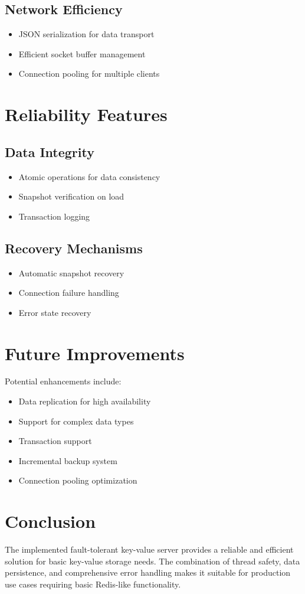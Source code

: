 \documentclass[11pt]{article}
\begin{document}
\subsection{Network Efficiency}
\begin{itemize}
    \item JSON serialization for data transport
    \item Efficient socket buffer management
    \item Connection pooling for multiple clients
\end{itemize}

\section{Reliability Features}

\subsection{Data Integrity}
\begin{itemize}
    \item Atomic operations for data consistency
    \item Snapshot verification on load
    \item Transaction logging
\end{itemize}

\subsection{Recovery Mechanisms}
\begin{itemize}
    \item Automatic snapshot recovery
    \item Connection failure handling
    \item Error state recovery
\end{itemize}

\section{Future Improvements}
Potential enhancements include:
\begin{itemize}
    \item Data replication for high availability
    \item Support for complex data types
    \item Transaction support
    \item Incremental backup system
    \item Connection pooling optimization
\end{itemize}

\section{Conclusion}
The implemented fault-tolerant key-value server provides a reliable and efficient solution for basic key-value storage needs. The combination of thread safety, data persistence, and comprehensive error handling makes it suitable for production use cases requiring basic Redis-like functionality.
\end{document}
